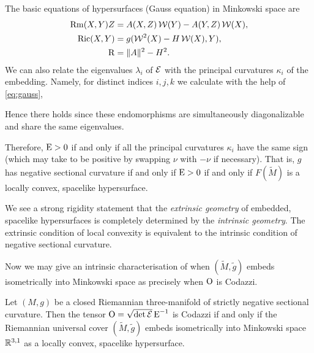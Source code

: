 \documentclass[a4paper,12pt]{amsart}
\begin{document}
The basic equations of hypersurfaces (Gauss equation) in Minkowski space are
\begin{equation}
\label{eq:gauss}
\begin{split}
\operatorname{Rm}(X, Y) Z &= A(X, Z) \operatorname{\mathcal{W}}(Y) - A(Y, Z) \operatorname{\mathcal{W}}(X), \\
\operatorname{Ric}(X, Y) &= g(\operatorname{\mathcal{W}}^2(X) - H \operatorname{\mathcal{W}}(X), Y), \\
\operatorname{R} &= \|A\|^2 - H^2.
\end{split}
\end{equation}
We can also relate the eigenvalues $\lambda_{i}$ of $\operatorname{\mathcal{E}}$ with the principal curvatures $\kappa_{i}$ of the embedding. Namely, for distinct indices \(i,j,k\) we calculate with the help of \eqref{eq:gauss},

Hence there holds
since these endomorphisms are simultaneously diagonalizable and share the same eigenvalues.

Therefore, \(\operatorname{E} > 0\) if and only if all the principal curvatures \(\kappa_i\) have the same sign (which may take to be positive by swapping \(\nu\) with \(-\nu\) if necessary). That is, \(g\) has negative sectional curvature if and only if \(\operatorname{E} > 0\) if and only if \(F(\tilde{M})\) is a locally convex, spacelike hypersurface.

\begin{rem}
We see a strong rigidity statement that the \emph{extrinsic geometry} of embedded, spacelike hypersurfaces is completely determined by the \emph{intrinsic geometry}. The extrinsic condition of local convexity is equivalent to the intrinsic condition of negative sectional curvature.
\end{rem}

Now we may give an intrinsic characterisation of when \((\tilde{M}, \tilde{g})\) embeds isometrically into Minkowski space as precisely when \(\operatorname{O}\) is Codazzi.

\begin{thm}
\label{thm:intg_embed}

Let \((M, g)\) be a closed Riemannian three-manifold of strictly negative sectional curvature. Then the tensor \(\operatorname{O} = \sqrt{\det \operatorname{\mathcal{E}}} \operatorname{E}^{-1}\) is Codazzi if and only if the Riemannian universal cover \((\tilde{M}, \tilde{g})\) embeds isometrically into Minkowski space \(\mathbb{R}^{3,1}\) as a locally convex, spacelike hypersurface.
\end{thm}
\end{document}
